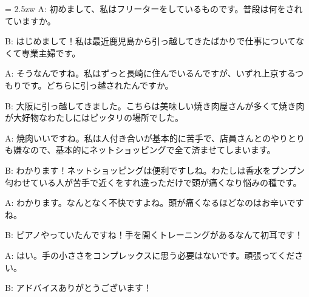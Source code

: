 \documentclass[11pt]{amsart}
\title{}
\author{}
\newenvironment{hangall}[1]{\hangindent = 2.5zw\everypar{\hangindent = 2.5zw}}{}
\begin{document}
\maketitle
\begin{hangall}{}%
A: 初めまして、私はフリーターをしているものです。普段は何をされていますか。



B: はじめまして！私は最近鹿児島から引っ越してきたばかりで仕事についてなくて専業主婦です。



A: そうなんですね。私はずっと長崎に住んでいるんですが、いずれ上京するつもりです。どちらに引っ越されたんですか。



B: 大阪に引っ越してきました。こちらは美味しい焼き肉屋さんが多くて焼き肉が大好物なわたしにはピッタリの場所でした。



A: 焼肉いいですね。私は人付き合いが基本的に苦手で、店員さんとのやりとりも嫌なので、基本的にネットショッピングで全て済ませてしまいます。



B: わかります！ネットショッピングは便利ですしね。わたしは香水をプンプン匂わせている人が苦手で近くをすれ違っただけで頭が痛くなり悩みの種です。



A: わかります。なんとなく不快ですよね。頭が痛くなるほどなのはお辛いですね。



B: ピアノやっていたんですね！手を開くトレーニングがあるなんて初耳です！



A: はい。手の小ささをコンプレックスに思う必要はないです。頑張ってください。



B: アドバイスありがとうございます！\end{hangall}
\end{document}
